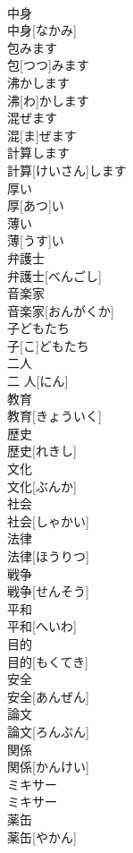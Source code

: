 \documentclass[8pt]{extreport}
\begin{document}
\begin{CJK}{UTF8}{min}
\\	中身	
\\	中身[なかみ]	
\\	包みます	
\\	包[つつ]みます	
\\	沸かします	
\\	沸[わ]かします	
\\	混ぜます	
\\	混[ま]ぜます	
\\	計算します	
\\	計算[けいさん]します	
\\	厚い	
\\	厚[あつ]い	
\\	薄い	
\\	薄[うす]い	
\\	弁護士	
\\	弁護士[べんごし]	
\\	音楽家	
\\	音楽家[おんがくか]	
\\	子どもたち	
\\	子[こ]どもたち	
\\	二人	
\\	二 人[にん]	
\\	教育	
\\	教育[きょういく]	
\\	歴史	
\\	歴史[れきし]	
\\	文化	
\\	文化[ぶんか]	
\\	社会	
\\	社会[しゃかい]	
\\	法律	
\\	法律[ほうりつ]	
\\	戦争	
\\	戦争[せんそう]	
\\	平和	
\\	平和[へいわ]	
\\	目的	
\\	目的[もくてき]	
\\	安全	
\\	安全[あんぜん]	
\\	論文	
\\	論文[ろんぶん]	
\\	関係	
\\	関係[かんけい]	
\\	ミキサー	
\\	ミキサー	
\\	薬缶	
\\	薬缶[やかん]	

\end{CJK}
\end{document}
